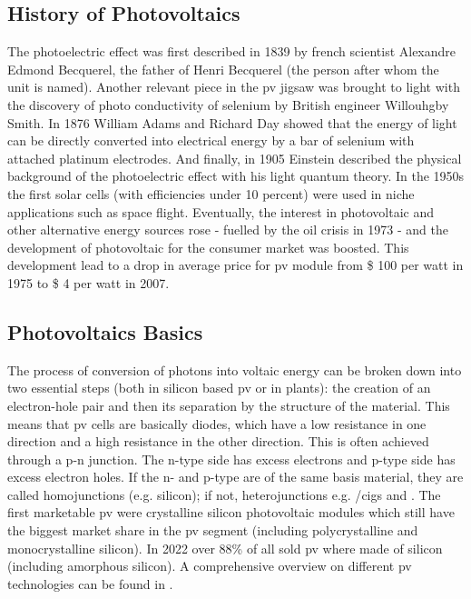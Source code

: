 \subsection{History of Photovoltaics}
The photoelectric effect was first described in 1839 by french scientist Alexandre 
Edmond \linebreak[4] 
Becquerel\cite{becquerel1839memoire}, the father of Henri Becquerel (the person after whom the unit is named).
Another relevant piece in the \gls{pv} jigsaw was brought to light
with the discovery of photo conductivity of selenium
by British engineer Willouhgby Smith\cite{Smith1873Selenium}.
In 1876 William Adams and Richard Day\cite{Adams1876Selenium} showed that 
the energy of light can be directly converted into electrical energy by a bar of 
selenium with attached platinum electrodes.
And finally, in 1905 Einstein described the physical background of the photoelectric 
effect with his light quantum theory\cite{einstein1905erzeugung}.
In the 1950s the first solar cells (with efficiencies under 10 percent) were used in niche applications such as space flight. 
Eventually, the interest in photovoltaic and other alternative energy sources 
rose - fuelled by the oil crisis in 1973 - 
and the development of photovoltaic for the consumer market was boosted. 
This development lead to a drop in 
average price for \gls{pv} module from \$ 100 per watt in 1975 to \$ 4 per watt in 2007\cite{pagliaro2008flexible}.

\subsection{Photovoltaics Basics}
The process of conversion of photons into voltaic energy can be broken down into two essential steps (both in silicon based \gls{pv} or in plants): 
the creation of an electron-hole pair and then its separation by the structure of the material\cite{markvart2013principles}.
This means that \gls{pv} cells are basically diodes, which have a low resistance in one direction and a high resistance in the other direction. 
This is often achieved through a p-n junction.
The n-type side has excess electrons and p-type side has excess electron holes. 
If the n- and p-type are of the same basis material, they are called homojunctions (e.g. silicon); if not, heterojunctions e.g. /\gls{cigs} and \cite{breitenstein2013understanding}.
%
The first marketable \gls{pv} were crystalline silicon photovoltaic modules which still 
have the biggest market share in the \gls{pv} segment (including polycrystalline and monocrystalline silicon).
In 2022 
over 88\% of all sold \gls{pv} where made of silicon (including amorphous silicon)\cite{breitenstein2013understanding}.
%
A comprehensive overview on different \gls{pv} technologies can be found in \cite{markvart2013principles}.



